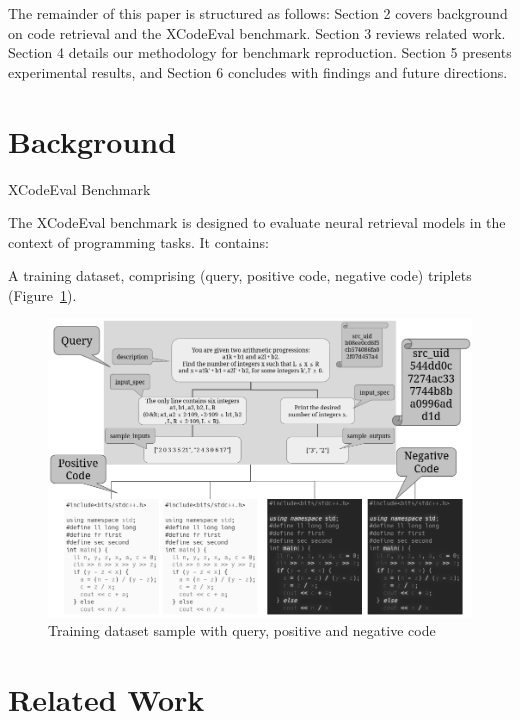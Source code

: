 \documentclass[12pt]{article}
\begin{document}
The remainder of this paper is structured as follows:
Section 2 covers background on code retrieval and the XCodeEval benchmark.
Section 3 reviews related work.
Section 4 details our methodology for benchmark reproduction.
Section 5 presents experimental results, and
Section 6 concludes with findings and future directions.

\section{Background}





XCodeEval Benchmark

The XCodeEval benchmark is designed to evaluate neural retrieval models in the context of programming tasks. It contains:

    A training dataset, comprising (query, positive code, negative code) triplets (Figure~\ref{fig:training}).


\begin{figure}[ht]
\centering
\includegraphics[width=1.0\textwidth]{images/task-gray.png}
\caption{Training dataset sample with query, positive and negative code}
\label{fig:training}
\end{figure}


\section{Related Work}
\end{document}
